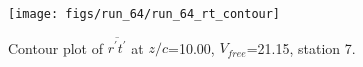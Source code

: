 \begin{figure}[H]
\centering
\texttt{[image: figs/run\_64/run\_64\_rt\_contour]}
\caption{Contour plot of $\overline{r^\prime t^\prime}$ at $z/c$=10.00, $V_{free}$=21.15, station 7.}
\label{fig:run_64_rt_contour}
\end{figure}



